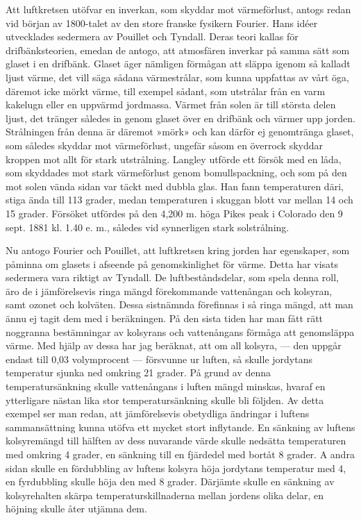 \documentclass[a4paper, 12pt, oneside, swedish]{article}
\begin{document}
Att luftkretsen utöfvar en inverkan, som skyddar mot värmeförlust, antogs redan vid början av 1800-talet av den store franske fysikern Fourier. Hans idéer utvecklades sedermera av Pouillet och Tyndall. Deras teori kallas för drifbänksteorien, emedan de antogo, att atmosfären inverkar på samma sätt som glaset i en drifbänk. Glaset äger nämligen förmågan att släppa igenom så kalladt ljust värme, det vill säga sådana värmestrålar, som kunna uppfattas av vårt öga, däremot icke mörkt värme, till exempel sådant, som utstrålar från en varm kakelugn eller en uppvärmd jordmassa. Värmet från solen är till största delen ljust, det tränger således in genom glaset över en drifbänk och värmer upp jorden. Strålningen från denna är däremot »mörk» och kan därför ej genomtränga glaset, som således skyddar mot värmeförlust, ungefär såsom en överrock skyddar kroppen mot allt för stark utstrålning. Langley utförde ett försök med en låda, som skyddades mot stark värmeförlust genom bomullspackning, och som på den mot solen vända sidan var täckt med dubbla glas. Han fann temperaturen däri, stiga ända till 113 grader, medan temperaturen i skuggan blott var mellan 14 och 15 grader. Försöket utfördes på den 4,200 m. höga Pikes peak i Colorado den 9 sept. 1881 kl. 1.40 e. m., således vid synnerligen stark solstrålning.

Nu antogo Fourier och Pouillet, att luftkretsen kring jorden har egenskaper, som påminna om glasets i afseende på genomskinlighet för värme. Detta har visats sedermera vara riktigt av Tyndall. De luftbeståndsdelar, som spela denna roll, äro de i jämförelsevis ringa mängd förekommande vattenångan och kolsyran, samt ozonet och kolväten. Dessa sistnämnda förefinnas i så ringa mängd, att man ännu ej tagit dem med i beräkningen. På den sista tiden har man fått rätt noggranna bestämningar av kolsyrans och vattenångans förmåga att genomsläppa värme. Med hjälp av dessa har jag beräknat, att om all kolsyra, --- den uppgår endast till 0,03 volymprocent --- försvunne ur luften, så skulle jordytans temperatur sjunka ned omkring 21 grader. På grund av denna temperatursänkning skulle vattenångans i luften mängd minskas, hvaraf en ytterligare nästan lika stor temperatursänkning skulle bli följden. Av detta exempel ser man redan, att jämförelsevis obetydliga ändringar i luftens sammansättning kunna utöfva ett mycket stort inflytande. En sänkning av luftens kolsyremängd till hälften av dess nuvarande värde skulle nedsätta temperaturen med omkring 4 grader, en sänkning till en fjärdedel med bortåt 8 grader. A andra sidan skulle en fördubbling av luftens kolsyra höja jordytans temperatur med 4, en fyrdubbling skulle höja den med 8 grader. Därjämte skulle en sänkning av kolsyrehalten skärpa temperaturskillnaderna mellan jordens olika delar, en höjning skulle åter utjämna dem.
\end{document}
